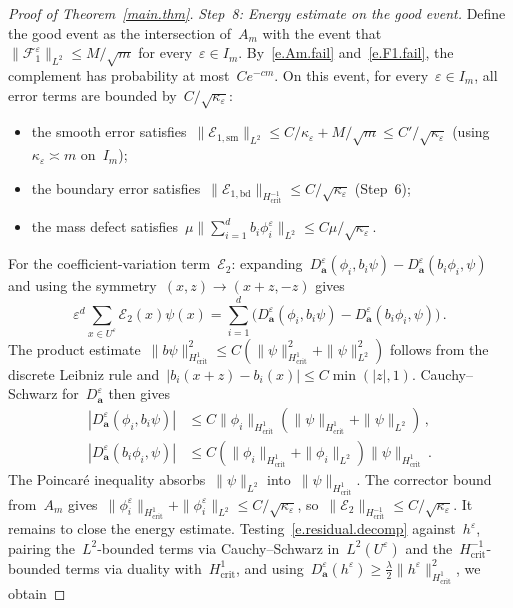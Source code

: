 \documentclass[11pt]{amsart}
\theoremstyle{plain}
\theoremstyle{definition}
\theoremstyle{remark}
\renewcommand{\a}{\mathbf{a}}
\newcommand{\eps}{\varepsilon}
\begin{document}
\begin{proof}[Proof of Theorem~\ref{main.thm}]
		\smallskip
		
		\emph{Step~8: Energy estimate on the good event.}
		Define the good event as the intersection of~$A_m$ with the event that~$\|\mathcal{F}_1^\eps\|_{L^2} \le M/\sqrt{m}$ for every~$\eps \in I_m$.
		By~\eqref{e.Am.fail} and~\eqref{e.F1.fail}, the complement has probability at most~$Ce^{-cm}$.
		On this event, for every~$\eps \in I_m$, all error terms are bounded by~$C/\sqrt{\kappa_\eps}$:
		\begin{itemize}
			\item the smooth error satisfies~$\|\mathcal{E}_{1,\mathrm{sm}}\|_{L^2} \le C/\kappa_\eps + M/\sqrt{m} \le C'/\sqrt{\kappa_\eps}$ (using~$\kappa_\eps \asymp m$ on~$I_m$);
			\item the boundary error satisfies~$\|\mathcal{E}_{1,\mathrm{bd}}\|_{H^{-1}_{\mathrm{crit}}} \le C/\sqrt{\kappa_\eps}$ (Step~6);
			\item the mass defect satisfies~$\mu\|\sum_{i=1}^{d} b_i\phi_i^\eps\|_{L^2} \le C\mu/\sqrt{\kappa_\eps}$.
		\end{itemize}
		For the coefficient-variation term~$\mathcal{E}_2$: expanding~$D_\a^\eps(\phi_i, b_i\psi) - D_\a^\eps(b_i\phi_i, \psi)$ and using the symmetry~$(x,z) \to (x{+}z,-z)$ gives
		\[
		\eps^d \sum_{x \in U^\eps} \mathcal{E}_2(x)\psi(x) = \sum_{i=1}^{d}\bigl(D_\a^\eps(\phi_i, b_i\psi) - D_\a^\eps(b_i\phi_i, \psi)\bigr)\,.
		\]
		The product estimate~$\|b\psi\|_{H^1_{\mathrm{crit}}}^2 \le C(\|\psi\|_{H^1_{\mathrm{crit}}}^2 + \|\psi\|_{L^2}^2)$ follows from the discrete Leibniz rule and~$|b_i(x{+}z) - b_i(x)| \le C\min(|z|,1)$.
		Cauchy--Schwarz for~$D_\a^\eps$ then gives
		\begin{align*}
			|D_\a^\eps(\phi_i, b_i\psi)| &\le C\|\phi_i\|_{H^1_{\mathrm{crit}}}(\|\psi\|_{H^1_{\mathrm{crit}}} + \|\psi\|_{L^2})\,, \\
			|D_\a^\eps(b_i\phi_i, \psi)| &\le C(\|\phi_i\|_{H^1_{\mathrm{crit}}} + \|\phi_i\|_{L^2})\|\psi\|_{H^1_{\mathrm{crit}}}\,.
		\end{align*}
		The Poincar\'e inequality absorbs~$\|\psi\|_{L^2}$ into~$\|\psi\|_{H^1_{\mathrm{crit}}}$.
		The corrector bound from~$A_m$ gives~$\|\phi_i^\eps\|_{H^1_{\mathrm{crit}}} + \|\phi_i^\eps\|_{L^2} \le C/\sqrt{\kappa_\eps}$, so~$\|\mathcal{E}_2\|_{H^{-1}_{\mathrm{crit}}} \le C/\sqrt{\kappa_\eps}$.
		It remains to close the energy estimate.
		Testing~\eqref{e.residual.decomp} against~$h^\eps$, pairing the~$L^2$-bounded terms via Cauchy--Schwarz in~$L^2(U^\eps)$ and the~$H^{-1}_{\mathrm{crit}}$-bounded terms via duality with~$H^1_{\mathrm{crit}}$, and using~$D_\a^\eps(h^\eps) \ge \frac{\lambda}{2}\|h^\eps\|_{H^1_{\mathrm{crit}}}^2$, we obtain

\end{proof}
\end{document}
